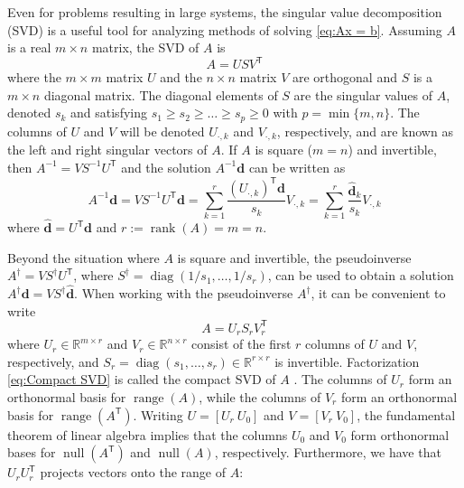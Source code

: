 \documentclass[12pt]{article}
\newcommand{\dVec}{\mathbf{d}}	%
\newcommand{\trans}[1]{{#1}^\mathsf{T}}	%
\newcommand{\inv}[1]{{#1}^{-1}}	%
\newcommand{\pinv}[1]{{#1}^\dagger}	%
\DeclareMathOperator{\diag}{diag}	%
\DeclareMathOperator{\rank}{rank}	%
\DeclareMathOperator{\range}{range}	%
\DeclareMathOperator{\nullspace}{null}	%
\newcommand{\singular}{s}	%
\newcommand{\svd}[1]{\widehat{#1}}	%
\begin{document}
Even for problems resulting in large systems, the singular value decomposition (SVD) is a useful tool for analyzing methods of solving \eqref{eq:Ax = b}.  Assuming $A$ is a real $m \times n$ matrix, the SVD of $A$ is
\begin{equation}
\label{eq:SVD}
A = US\trans{V}
\end{equation}
where the $m \times m$ matrix $U$ and the $n \times n$ matrix $V$ are orthogonal and $S$ is a $m \times n$ diagonal matrix. The diagonal elements of $S$ are the singular values of $A$, denoted $\singular_k$ and satisfying $\singular_1 \geq \singular_2 \geq \ldots \geq \singular_{p} \geq 0$ with $p = \min\{m,n\}$. The columns of $U$ and $V$ will be denoted $U_{\cdot,k}$ and $V_{\cdot,k}$, respectively, and are known as the left and right singular vectors of $A$. If $A$ is square ($m = n$) and invertible, then $\inv{A} = V\inv{S}\trans{U}$ and the solution $\inv{A}\dVec$ can be written as
\begin{equation}
\label{eq:InvProd}
\inv{A}\dVec = VS^{-1}{\trans{U}}\dVec = \sum_{k=1}^{r} \frac{{\trans{(U_{\cdot,k})}}\dVec}{\singular_k}V_{\cdot,k} = \sum_{k=1}^{r} \frac{\svd{\dVec}_k}{\singular_k}V_{\cdot,k}
\end{equation}
where $\svd{\dVec} = \trans{U}\dVec$ and $r := \rank(A) = m = n$. \par 
Beyond the situation where $A$ is square and invertible, the pseudoinverse $\pinv{A} = V\pinv{S}\trans{U}$, where $\pinv{S} = \diag(1/\singular_1,\ldots,1/\singular_{r})$, can be used to obtain a solution $\pinv{A}\dVec = V\pinv{S}\svd{\dVec}$. When working with the pseudoinverse $\pinv{A}$, it can be convenient to write
\begin{equation}
\label{eq:Compact SVD}
A = U_rS_r\trans{V}_r
\end{equation}
where $U_r \in \mathbb{R}^{m \times r}$ and $V_r \in \mathbb{R}^{n \times r}$ consist of the first $r$ columns of $U$ and $V$, respectively, and $S_r = \diag(\singular_1,\ldots,\singular_{r}) \in \mathbb{R}^{r \times r}$ is invertible. Factorization \eqref{eq:Compact SVD} is called the compact SVD of $A$ \cite{ABT,Leon2010}. The columns of $U_r$ form an orthonormal basis for $\range(A)$, while the columns of $V_r$ form an orthonormal basis for $\range(\trans{A})$. Writing $U = [U_r ~ U_0]$ and $V = [V_r ~ V_0]$, the fundamental theorem of linear algebra \cite{Strang1993} implies that the columns $U_0$  and $V_0$ form orthonormal bases for $\nullspace(\trans{A})$ and $\nullspace(A)$, respectively. Furthermore, we have that $U_r\trans{U}_r$ projects vectors onto the range of $A$:
\end{document}
